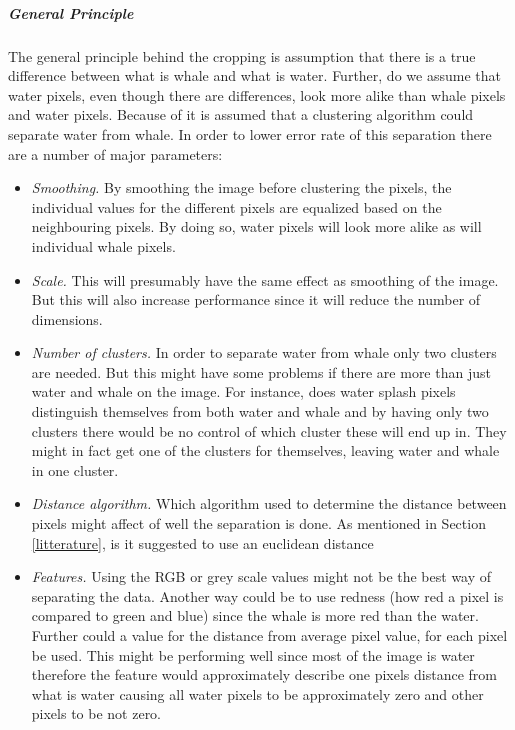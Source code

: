 \subparagraph{General Principle}
The general principle behind the cropping is  assumption that there is a true difference between what is whale and what is water. Further, do we assume that water pixels, even though there are differences, look more alike than whale pixels and water pixels.
Because of it is assumed that a clustering algorithm could separate water from whale.
In order to lower error rate of this separation there are a number of major parameters:
\begin{itemize}
\item \textit{Smoothing.} By smoothing the image before clustering the pixels, the individual values for the different pixels are equalized based on the neighbouring pixels. By doing so, water pixels will look more alike as will individual whale pixels.
\item \textit{Scale.} This will presumably have the same effect as smoothing of the image. But this will also increase performance since it will reduce the number of dimensions.  
\item \textit{Number of clusters.} In order to separate water from whale only two clusters are needed. But this might have some problems if there are more than just water and whale on the image. For instance, does water splash pixels distinguish themselves from both water and whale and by having  only two clusters there would be no control of which cluster these will end up in. They might in fact get one of the clusters for themselves, leaving water and whale in one cluster.
\item \textit{Distance algorithm.} Which algorithm used to determine the distance between pixels might affect of well the separation is done. As mentioned in Section \ref{litterature}, is it suggested to use an euclidean distance
\item \textit{Features.} Using the RGB or grey scale values might not be the best way of separating the data. Another way could be to use redness (how red a pixel is compared to green and blue) since the whale is more red than the water. Further could a value for the distance from average pixel value, for each pixel be used. This might be performing well since most of the image is water therefore the feature would approximately describe one pixels distance from what is water causing all water pixels to be approximately zero and other pixels to be not zero.
\end{itemize}
